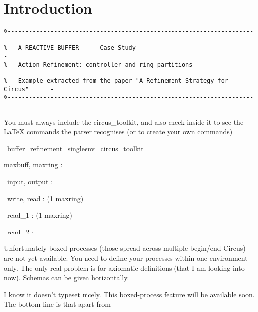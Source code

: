 \documentclass{article}
\begin{document}
\section{Introduction}

\begin{verbatim}
%-----------------------------------------------------------------------------
%-- A REACTIVE BUFFER    - Case Study                                        -
%-- Action Refinement: controller and ring partitions                        -
%-- Example extracted from the paper "A Refinement Strategy for Circus"      -
%-----------------------------------------------------------------------------
\end{verbatim}

You must always include the circus\_toolkit, and also check inside
it to see the LaTeX commands the parser recognises (or to create
your own commands)

\begin{zsection}
  \SECTION\ buffer\_refinement\_singleenv \parents\ circus\_toolkit
\end{zsection}

\begin{axdef}
 maxbuff, maxring : \nat
\end{axdef}

\begin{circus}
 \circchannel\ input, output : \nat
\end{circus}

\begin{circus}
 \circchannel\ write, read : (1 \upto maxring) \cross \nat
\end{circus}

\begin{circus}
 \circchannel\ read\_1 : (1 \upto maxring)
\end{circus}

\begin{circus}
 \circchannel\ read\_2 : \nat
\end{circus}

Unfortunately boxed processes (those spread across multiple
begin/end Circus) are not yet available. You need to define your
processes within one environment only. The only real problem is for
axiomatic definitions (that I am looking into now). Schemas can be
given horizontally.

I know it doesn't typeset nicely. This boxed-process feature will be
available soon. The bottom line is that apart from
\end{document}
